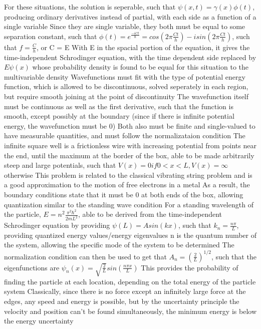 \documentclass[11 pt, twoside]{article}
\newenvironment{outline*}
{
	\begin{outline}[enumerate]
	}
	{\end{outline}
}
\begin{document}
\begin{outline*}
		\3 For these situations, the solution is seperable, such that $\psi(x, t) = \gamma(x)\phi(t)$, producing ordinary derivatives instead of partial, with each side as a function of a single variable
		\3 Since they are single variable, they both must be equal to some separation constant, such that $\phi(t) = e^{\frac{-iCt}{\hbar}} = cos(2\pi \frac{Ct}{h}) - isin(2\pi \frac{Ct}{h})$, such that $f = \frac{C}{h}$, or C = E
			\4 With E in the spacial portion of the equation, it gives the time-independent Schrodinger equation, with the time dependent side replaced by $E\psi(x)$ whose probability density is found to be equal for this situation to the multivariable density
	\2 Wavefunctions must fit with the type of potential energy function, which is allowed to be discontinuous, solved seperately in each region, but require smooth joining at the point of discontinuity
		\3 The wavefunction itself must be continuous as well as the first derivative, such that the function is smooth, except possibly at the boundary (since if there is infinite potential energy, the wavefunction must be 0)
		\3 Both also must be finite and single-valued to have measurable quantities, and must follow the normalizataion condition
\1 The infinite square well is a frictionless wire with increasing potential from points near the end, until the maximum at the border of the box, able to be made arbitrarily steep and large potentials, such that $V(x) = 0 if 0 < x < L, V(x) = \infty$ otherwise
	\2 This problem is related to the classical vibrating string problem and is a good approximation to the motion of free electrons in a metal
	\2 As a result, the boundary conditions state that it must be 0 at both ends of the box, allowing quantization similar to the standing wave condition
		\3 For a standing wavelength of the particle, $E = n^2\frac{\pi^2\hbar^2}{2mL^2}$, able to be derived from the time-independent Schrodinger equation by providing $\psi(L) = Asin(kx)$, such that $k_n = \frac{n\pi}{L}$, providing quantized energy values/energy eigenvalues
			\4 n is the quantum number of the system, allowing the specific mode of the system to be determined
		\3 The normalization condition can then be used to get that $A_n = (\frac{2}{L})^{1/2}$, such that the eigenfunctions are $\psi_n(x) = \sqrt{\frac{2}{L}}sin(\frac{n\pi x}{L})$
		\3 This provides the probability of finding the particle at each location, depending on the total energy of the particle system
	\2 Classically, since there is no force except an infinitely large force at the edges, any speed and energy is possible, but by the uncertainty principle the velocity and position can't be found simultaneously, the minimum energy is below the energy uncertainty

\end{outline*}
\end{document}

